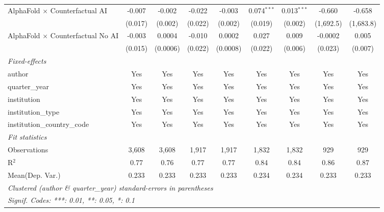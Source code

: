\begin{tabular}{lcccccccc}
   AlphaFold $\times$ Counterfactual AI     & -0.007        & -0.002   & -0.022  & -0.003   & 0.074$^{***}$ & 0.013$^{***}$ & -0.660    & -0.658\\   
                                            & (0.017)       & (0.002)  & (0.022) & (0.002)  & (0.019)       & (0.002)       & (1,692.5) & (1,683.8)\\   
   AlphaFold $\times$ Counterfactual No AI  & -0.003        & 0.0004   & -0.010  & 0.0002   & 0.027         & 0.009         & -0.0002   & 0.005\\   
                                            & (0.015)       & (0.0006) & (0.022) & (0.0008) & (0.022)       & (0.006)       & (0.023)   & (0.007)\\   
   \midrule
   \emph{Fixed-effects}\\
   author                                   & Yes           & Yes      & Yes     & Yes      & Yes           & Yes           & Yes       & Yes\\  
   quarter\_year                            & Yes           & Yes      & Yes     & Yes      & Yes           & Yes           & Yes       & Yes\\  
   institution                              & Yes           & Yes      & Yes     & Yes      & Yes           & Yes           & Yes       & Yes\\  
   institution\_type                        & Yes           & Yes      & Yes     & Yes      & Yes           & Yes           & Yes       & Yes\\  
   institution\_country\_code               & Yes           & Yes      & Yes     & Yes      & Yes           & Yes           & Yes       & Yes\\  
   \midrule
   \emph{Fit statistics}\\
   Observations                             & 3,608         & 3,608    & 1,917   & 1,917    & 1,832         & 1,832         & 929       & 929\\  
   R$^2$                                    & 0.77          & 0.76     & 0.77    & 0.77     & 0.84          & 0.84          & 0.86      & 0.87\\  
Mean(Dep. Var.) & 0.233 & 0.233 & 0.233 & 0.233 & 0.234 & 0.234 & 0.233 & 0.233 \\
   \midrule \midrule
   \multicolumn{9}{l}{\emph{Clustered (author \& quarter\_year) standard-errors in parentheses}}\\
   \multicolumn{9}{l}{\emph{Signif. Codes: ***: 0.01, **: 0.05, *: 0.1}}\\
\end{tabular}
\par\endgroup
